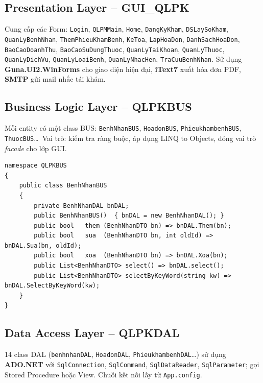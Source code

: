 \documentclass[12pt,a4paper]{report}
\begin{document}
\subsection{Presentation Layer -- GUI\_QLPK}

Cung cấp các Form: \texttt{Login}, \texttt{QLPMMain}, \texttt{Home}, \texttt{DangKyKham}, \texttt{DSLaySoKham}, \texttt{QuanLyBenhNhan}, \texttt{ThemPhieuKhamBenh}, \texttt{KeToa}, \texttt{LapHoaDon}, \texttt{DanhSachHoaDon}, \texttt{BaoCaoDoanhThu}, \texttt{BaoCaoSuDungThuoc}, \texttt{QuanLyTaiKhoan}, \texttt{QuanLyThuoc}, \texttt{QuanLyDichVu}, \texttt{QuanLyLoaiBenh}, \texttt{QuanLyNhacHen}, \texttt{TraCuuBenhNhan}. Sử dụng \textbf{Guna.UI2.WinForms} cho giao diện hiện đại, \textbf{iText7} xuất hóa đơn PDF, \textbf{SMTP} gửi mail nhắc tái khám.

\subsection{Business Logic Layer -- QLPKBUS}

Mỗi entity có một class BUS: \texttt{BenhNhanBUS}, \texttt{HoadonBUS}, \texttt{PhieukhambenhBUS}, \texttt{ThuocBUS}\ldots\ Vai trò: kiểm tra ràng buộc, áp dụng LINQ to Objects, đóng vai trò \textit{facade} cho lớp GUI.

\begin{lstlisting}[style=csharp,caption={Lớp BUS trung gian giữa GUI và DAL}]
namespace QLPKBUS
{
    public class BenhNhanBUS
    {
        private BenhNhanDAL bnDAL;
        public BenhNhanBUS()  { bnDAL = new BenhNhanDAL(); }
        public bool   them (BenhNhanDTO bn) => bnDAL.Them(bn);
        public bool   sua  (BenhNhanDTO bn, int oldId) => bnDAL.Sua(bn, oldId);
        public bool   xoa  (BenhNhanDTO bn) => bnDAL.Xoa(bn);
        public List<BenhNhanDTO> select() => bnDAL.select();
        public List<BenhNhanDTO> selectByKeyWord(string kw) => bnDAL.SelectByKeyWord(kw);
    }
}
\end{lstlisting}

\subsection{Data Access Layer -- QLPKDAL}

14 class DAL (\texttt{benhnhanDAL}, \texttt{HoadonDAL}, \texttt{PhieukhambenhDAL}\ldots) sử dụng \textbf{ADO.NET} với \texttt{SqlConnection}, \texttt{SqlCommand}, \texttt{SqlDataReader}, \texttt{SqlParameter}; gọi Stored Procedure hoặc View. Chuỗi kết nối lấy từ \texttt{App.config}.
\end{document}
